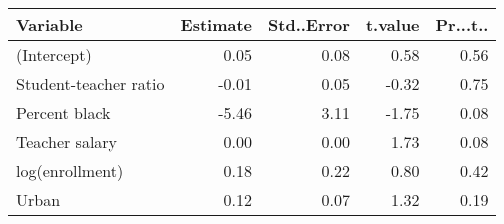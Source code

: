 \begin{tabular}{lrrrr}
  \hline
Variable & Estimate & Std..Error & t.value & Pr...t.. \\ 
  \hline
(Intercept) & 0.05 & 0.08 & 0.58 & 0.56 \\ 
  Student-teacher ratio & -0.01 & 0.05 & -0.32 & 0.75 \\ 
  Percent black & -5.46 & 3.11 & -1.75 & 0.08 \\ 
  Teacher salary & 0.00 & 0.00 & 1.73 & 0.08 \\ 
  log(enrollment) & 0.18 & 0.22 & 0.80 & 0.42 \\ 
  Urban & 0.12 & 0.07 & 1.32 & 0.19 \\ 
   \hline
\end{tabular}

